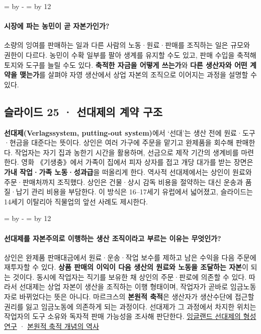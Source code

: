 \documentclass[10pt,a4paper]{article}
\newcommand{\ReserveQuestionSpace}{%
  \par\begingroup
  \dimen0=\pagegoal \advance\dimen0 by -\pagetotal
  \dimen2=\baselineskip \multiply\dimen2 by 12
  \ifdim\dimen0<\dimen2 \newpage\fi
  \endgroup}
\begin{document}
\ReserveQuestionSpace
\paragraph{시장에 파는 농민이 곧 자본가인가?}
소량의 잉여를 판매하는 일과 다른 사람의 노동·원료·판매를 조직하는 일은 규모와 권한이 다르다. 농민이 수확 일부를 팔아 생계를 유지할 수도 있고, 판매 수입을 축적해 토지와 도구를 늘릴 수도 있다. \textbf{축적한 자금을 어떻게 쓰는가}와 \textbf{다른 생산자와 어떤 계약을 맺는가}를 살펴야 자영 생산에서 상업 자본의 조직으로 이어지는 과정을 설명할 수 있다.\par

\subsection{슬라이드 25 · 선대제의 계약 구조}
\textbf{선대제(Verlagssystem, putting-out system)}에서 ‘선대’는 생산 전에 원료·도구·현금을 대준다는 뜻이다. 상인은 여러 가구에 주문을 맡기고 완제품을 회수해 판매한다. 작업자는 자기 집과 농한기 시간을 활용하며, 선금으로 제작 기간의 생계비를 마련한다. 영화 《기생충》에서 가족이 집에서 피자 상자를 접고 개당 대가를 받는 장면은 \textbf{가내 작업·가족 노동·성과급}을 떠올리게 한다. 역사적 선대제에서는 상인이 원료와 주문·판매처까지 조직했다. 상인은 건물·상시 감독 비용을 절약하는 대신 운송과 품질·납기 관리 비용을 부담한다. 이 방식은 16–17세기 유럽에서 넓어졌고, 슬라이드는 14세기 이탈리아 직물업의 앞선 사례도 제시한다.\par

\ReserveQuestionSpace
\paragraph{선대제를 자본주의로 이행하는 생산 조직이라고 부르는 이유는 무엇인가?}

상인은 완제품 판매대금에서 원료·운송·작업 보수를 제하고 남은 수익을 다음 주문에 재투자할 수 있다. \textbf{상품 판매의 이익이 다음 생산의 원료와 노동을 조달하는 자본}이 되는 것이다. 동시에 작업자는 직기를 보유한 채 상인의 주문·판로에 의존할 수 있다. 따라서 선대제는 상업 자본이 생산을 조직하는 이행 형태이며, 작업자가 곧바로 임금노동자로 바뀌었다는 뜻은 아니다. 마르크스의 \textbf{본원적 축적}은 생산자가 생산수단에 접근할 권리를 잃고 임금노동에 의존하게 되는 과정이다. 선대제가 그 과정에서 차지한 위치는 작업자의 도구 소유와 독자적 판매 가능성을 조사해 판단한다. \href{https://books.fupress.com/chapter/the-origins-of-the-putting-out-or-domestic-system-of-industrial-production-in-england/13612}{잉글랜드 선대제의 형성 연구} · \href{https://www.cambridge.org/core/journals/international-review-of-social-history/article/introduction-primitive-accumulation-and-socialism/F1C7E8E63C09AB65349854834AB32630}{본원적 축적 개념의 역사}\par
\end{document}
